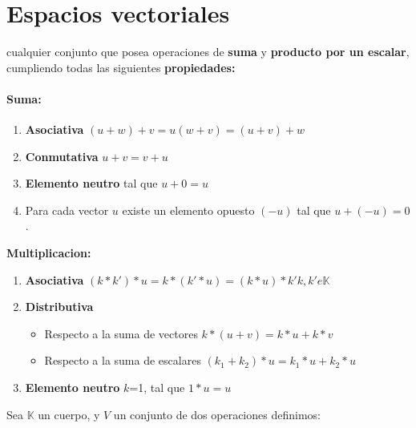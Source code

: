 \documentclass[10pt]{article}
\begin{document}
 
\maketitle

\section{Espacios vectoriales}

cualquier conjunto que posea operaciones de \textbf{suma} y 
\textbf{producto por un escalar}, cumpliendo todas las siguientes \textbf{propiedades:}\\

\linebreak

\paragraph{Suma: }

\begin{enumerate}
    \item \textbf{Asociativa} $(u+w) + v = u (w+v) = (u+v) + w$
    \item \textbf{Conmutativa} $u + v = v + u $
    \item \textbf{Elemento neutro} tal que $u + 0 = u$ 
    \item Para cada vector $u$ existe un elemento opuesto $(-u)$ tal que $u+(-u)=0$.
    
\end{enumerate}

\textbf{Multiplicacion: }

\begin{enumerate}
    \item \textbf{Asociativa} $(k*k')*u=k*(k'*u)=(k*u)*k'  k,k' e \mathbb{K}$
    \item \textbf{Distributiva}
    \begin{itemize}
        \item Respecto a la suma de vectores  $k*(u+v) = k*u+k*v$
        \item Respecto a la suma de escalares  $(k_1+k_2) *u = k_1*u + k_2 *u$   
    
    \end{itemize}
    \item \textbf{Elemento neutro} $k$=1, tal que $1*u = u$
    
\end{enumerate}

Sea $\mathbb{K}$ un cuerpo, y $V$ un conjunto de dos operaciones definimos:
\end{document}
